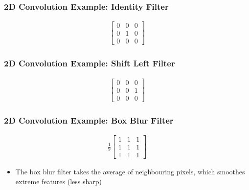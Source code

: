 \documentclass[letterpaper,12pt]{article}
\begin{document}
\subsubsection{2D Convolution Example: Identity Filter}
\begin{align}
 \begin{bmatrix}
  0 & 0 & 0 \\
  0 & 1 & 0 \\
  0 & 0 & 0
 \end{bmatrix}
 \tag{No change in output}
\end{align}

\subsubsection{2D Convolution Example: Shift Left Filter}
\begin{align}
 \begin{bmatrix}
  0 & 0 & 0 \\
  0 & 0 & 1 \\
  0 & 0 & 0
 \end{bmatrix}
 \tag{Shifts image left by 1 pixel}
\end{align}

\subsubsection{2D Convolution Example: Box Blur Filter}
\begin{align}
 \frac{1}{9}\begin{bmatrix}
  1 & 1 & 1 \\
  1 & 1 & 1 \\
  1 & 1 & 1
 \end{bmatrix}
 \tag{Blurs image}
\end{align}
\begin{itemize}
 \item The box blur filter takes the average of neighbouring pixels, which smoothes extreme features (less sharp)
\end{itemize}
\end{document}
